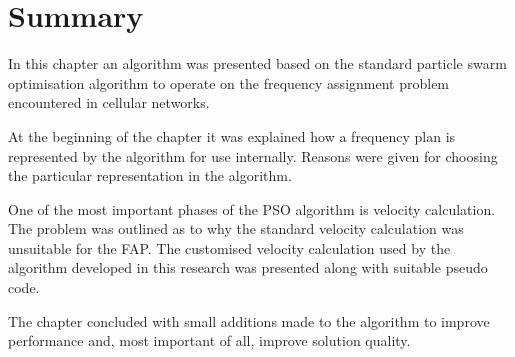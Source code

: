 \section{Summary}
In this chapter an algorithm was presented based on the standard particle swarm optimisation algorithm to operate on the frequency assignment problem encountered in cellular networks.

At the beginning of the chapter it was explained how a frequency plan is represented by the algorithm for use internally. Reasons were given for choosing the particular representation in the algorithm.

One of the most important phases of the \gls{PSO} algorithm is velocity calculation. The problem was outlined as to why the standard velocity calculation was unsuitable for the \gls{FAP}. The customised velocity calculation used by the algorithm developed in this research was presented along with suitable pseudo code.

The chapter concluded with small additions made to the algorithm to improve performance and, most important of all, improve solution quality.
